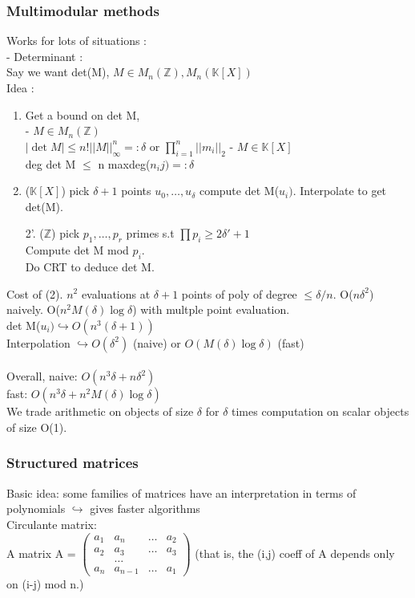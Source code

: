 \documentclass{article}
\theoremstyle{definition}
\theoremstyle{remark}
\newcommand{\Z}{\mathbb{Z}}
\newcommand{\K}{\mathbb{K}}
\begin{document}
\subsubsection{Multimodular methods}
Works for lots of situations :\\
- Determinant :\\
Say we want det(M), $M \in M_n(\Z), M_n(\K[X])$\\
Idea :\begin{enumerate}
	\item Get a bound on det M,\\
	- $M \in M_n(\Z)$\\
	$|\det M| \leq n!||M||_\infty^n =: \delta$ or $\prod_{i=1}^{n} ||m_i||_2$
	- $M \in \K[X]$\\
	deg det M $\leq$ n maxdeg($n_ij) =: \delta$
	\item ($\K[X]$) pick $\delta + 1$ points $u_0,\dots,u_\delta$ compute det M($u_i)$. Interpolate to get det(M).
	\item[2'.] ($\Z$) pick $p_1,\dots,p_r$ primes s.t $\prod p_i \geq 2\delta'+1$\\
	Compute det M mod $p_i$.\\
	Do CRT to deduce det M.
\end{enumerate}
Cost of (2).
$n^2$ evaluations at $\delta +1$ points of poly of degree $\leq \delta/n$. O($n\delta^2$) naively. O($n^2M(\delta)\log\delta$) with multple point evaluation.\\
det M($u_i) \hookrightarrow O(n^3(\delta + 1))$\\
Interpolation $\hookrightarrow O(\delta^2)$ (naive) or $O(M(\delta)\log\delta)$ (fast)\\\\
Overall, naive: $O(n^3\delta + n\delta^2)$\\
\indent fast: $O(n^3\delta + n^2M(\delta)\log\delta)$\\

We trade arithmetic on objects of size $\delta$ for $\delta$ times computation on scalar objects of size O(1).

\subsubsection{Structured matrices}
Basic idea: some families of matrices have an interpretation in terms of polynomials $\hookrightarrow$ gives faster algorithms\\

Circulante matrix:\\
A matrix A = $\begin{pmatrix}
a_1&a_n&\dots&a_2\\
a_2&a_3&\dots&a_3\\
&\dots\\
a_n&a_{n-1}&\dots&a_1
\end{pmatrix}$
(that is, the (i,j) coeff of A depends only on (i-j) mod n.)
\end{document}
